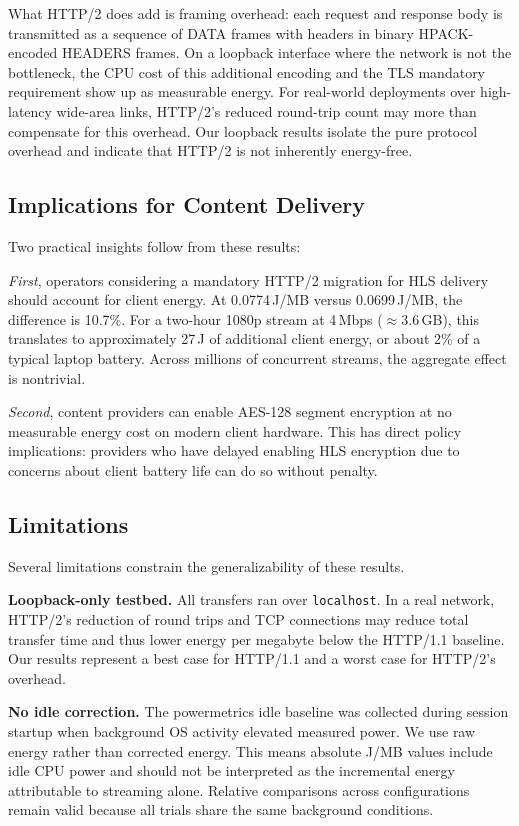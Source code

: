 \documentclass[conference]{IEEEtran}
\begin{document}
What HTTP/2 does add is framing overhead: each request and response body is
transmitted as a sequence of DATA frames with headers in binary HPACK-encoded HEADERS
frames. On a loopback interface where the network is not the bottleneck, the CPU cost
of this additional encoding and the TLS mandatory requirement show up as measurable
energy. For real-world deployments over high-latency wide-area links, HTTP/2's reduced
round-trip count may more than compensate for this overhead. Our loopback results
isolate the pure protocol overhead and indicate that HTTP/2 is not inherently
energy-free.

\subsection{Implications for Content Delivery}

Two practical insights follow from these results:

\textit{First}, operators considering a mandatory HTTP/2 migration for HLS delivery
should account for client energy. At 0.0774\,J/MB versus 0.0699\,J/MB, the difference
is 10.7\%. For a two-hour 1080p stream at 4\,Mbps ($\approx$3.6\,GB), this translates
to approximately 27\,J of additional client energy, or about 2\% of a typical laptop
battery. Across millions of concurrent streams, the aggregate effect is nontrivial.

\textit{Second}, content providers can enable AES-128 segment encryption at no
measurable energy cost on modern client hardware. This has direct policy implications:
providers who have delayed enabling HLS encryption due to concerns about client
battery life can do so without penalty.

\subsection{Limitations}

Several limitations constrain the generalizability of these results.

\textbf{Loopback-only testbed.} All transfers ran over \texttt{localhost}. In a real
network, HTTP/2's reduction of round trips and TCP connections may reduce total
transfer time and thus lower energy per megabyte below the HTTP/1.1 baseline. Our
results represent a best case for HTTP/1.1 and a worst case for HTTP/2's overhead.

\textbf{No idle correction.} The powermetrics idle baseline was collected during
session startup when background OS activity elevated measured power. We use raw energy
rather than corrected energy. This means absolute J/MB values include idle CPU power
and should not be interpreted as the incremental energy attributable to streaming
alone. Relative comparisons across configurations remain valid because all trials
share the same background conditions.
\end{document}

